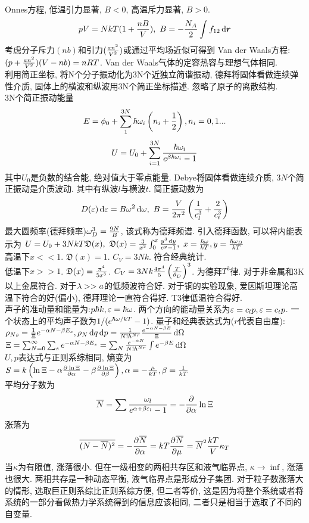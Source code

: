 \documentclass[UTF8,8pt]{ctexart}
\newcommand{\q}[1]{{\color{red} #1}}
\begin{document}
\begin{multicols}{3}
Onnes方程, 低温引力显著, $B<0$, 高温斥力显著, $B>0$. 
$$pV=NkT(1+\frac{nB}{V}),\ B=-\frac{N_A}{2}\int f_{12}\mathop{}\!\mathrm{d}\bm{r}$$
考虑分子斥力$(nb)$和引力$(\frac{an^2}{V^2})$或通过平均场近似可得到\q{Van der Waals方程}: $(p+\frac{an^2}{V^2})(V-nb)=nRT$. Van der Waals气体的定容热容与理想气体相同. \\
利用简正坐标, 将N个分子振动化为3N个近独立简谐振动, 德拜将固体看做连续弹性介质, 固体上的横波和纵波用3N个简正坐标描述. 忽略了原子的离散结构. 
\\3N个简正振动能量
$$E=\phi_0+\sum_1^{3N}\hbar\omega_i\left( n_i+\frac{1}{2} \right),n_i=0,1...$$
$$U=U_0+\sum_{i=1}^{3N}\frac{\hbar\omega_i}{e^{\beta\hbar\omega_i}-1}$$
其中$U_0$是负数的结合能, 绝对值大于零点能量. 
Debye将固体看做连续介质, $3N$个简正振动是介质波动. 其中有纵波$l$与横波$t$. 简正振动数为
$$D(\ep)\d\ep=B\o^2\d\o,\ B=\f{V}{2\pi^2}\of{\ff{c_l^3}+\f{2}{c^3_t}}$$
最大圆频率(德拜频率)$\omega_D^3=\frac{9N}{B}$, 该式称为德拜频谱. 引入德拜函数, 可以将内能表示为
$U=U_0+3NkT\mathfrak{D}(x),\ \mathfrak{D}(x)=\f{3}{x^3}\int_0^x\f{y^3\d y}{e^y-1},\ x=\f{\hbar\o}{kT},y=\f{\hbar\o_D}{kT}$\\
高温下$x<<1$. $\mathfrak{D}(x)=1$. $C_V=3Nk$. 符合经典统计. \\
低温下$x>>1$. $\mathfrak{D}(x)=\frac{\pi^4}{5x^3}$. $C_V=3Nk\frac{4\pi^4}{5}\left( \frac{T}{\theta_D} \right)^3$. 为德拜$T^3$律. 对于非金属和3K以上金属符合. 对于$\lambda>>a$的低频波符合好. 对于铜的实验现象, 爱因斯坦理论高温下符合的好(偏小), 德拜理论一直符合得好. T3律低温符合得好. \\
声子的准动量和能量为:$p\hbar k,\varepsilon=\hbar\omega$. 两个方向的能动量关系为$\varepsilon=c_lp,\varepsilon=c_tp$. 一个状态上的平均声子数为$1/(e^{\hbar\omega/kT}-1)$.
量子和经典表达式为($r$代表自由度):\\
$\rho_{Ns}=\frac{1}{\Xi}e^{-\alpha N-\beta E_s},\rho_N\mathop{}\!\mathrm{d} q\mathop{}\!\mathrm{d} p=\frac{1}{N!h^{Nr}}\frac{e^{-\alpha N-\beta E}}{\Xi}\mathop{}\!\mathrm{d}\Omega$\\
$\Xi=\sum_{N=0}^\infty\sum_s e^{-\alpha N-\beta E_s}=\sum_N\frac{e^{-\alpha N}}{N!h^{Nr}}\int e^{-\beta E}\mathop{}\!\mathrm{d}\Omega$\\
$U,p$表达式与正则系综相同, 熵变为
$S = k\left( \ln \Xi-\alpha\frac{\partial^{} \ln \Xi}{\partial {\alpha}^{}}-\beta\frac{\partial^{} \ln \Xi}{\partial {\beta}^{}} \right),\alpha=-\frac{\mu}{kT},\beta=\frac{1}{kT}$\\
平均分子数为
$$\overline{N} = \sum \frac{\omega_l}{e^{\alpha+\beta\varepsilon_l}-1}=-\frac{\partial^{} }{\partial {\alpha}^{}}\ln\Xi$$
涨落为
$$\overline{(N-\overline{N})^2}=-\frac{\partial^{} \overline{N}}{\partial {\alpha}^{}}=kT\frac{\partial^{} \overline{N}}{\partial {\mu}^{}}=\overline{N}^2\frac{kT}{V}\kappa_T$$
当$\kappa$为有限值, 涨落很小. 但在一级相变的两相共存区和液气临界点, $\kappa\to\inf$, 涨落也很大. 两相共存是一种动态平衡, 液气临界点是形成分子集团. 对于粒子数涨落大的情形, 选取巨正则系综比正则系综方便, 但二者等价, 这是因为将整个系统或者将系统的一部分看做热力学系统得到的信息应该相同, 二者只是相当于选取了不同的自变量. 

\end{multicols}
\end{document}
